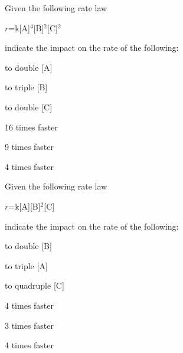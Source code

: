 \documentclass[main.tex]{subfiles}
\begin{document}
\begin{multicols*}{2}
\begin{question}[ID=\the\value{numA}]
Given the following rate law
\begin{center}$r$=k[A]$^4$[B]$^2$[C]$^2$\end{center}
indicate the impact on the rate of the following:
\begin{inparaenum}[(a)]
\item  to double [A]  %
\item  to triple [B]  %
\item  to double [C]%
\end{inparaenum}
\end{question}
\begin{solution}
\begin{inparaenum}[(a)]
\item    16 times faster 
\item    9 times faster  
\item    4 times faster 
\end{inparaenum}\hspace{0.1cm}\end{solution}%

\begin{question}[ID=\the\value{numA}]
Given the following rate law
\begin{center}$r$=k[A][B]$^2$[C]\end{center}
indicate the impact on the rate of the following:
\begin{inparaenum}[(a)]
\item  to double [B]  %
\item  to triple [A]  %
\item  to quadruple [C]%
\end{inparaenum}
\end{question}
\begin{solution}
\begin{inparaenum}[(a)]
\item  4 times faster
\item   3 times faster 
\item   4 times faster 
\end{inparaenum}\hspace{0.1cm}\end{solution}%



\end{multicols*}
\end{document}
